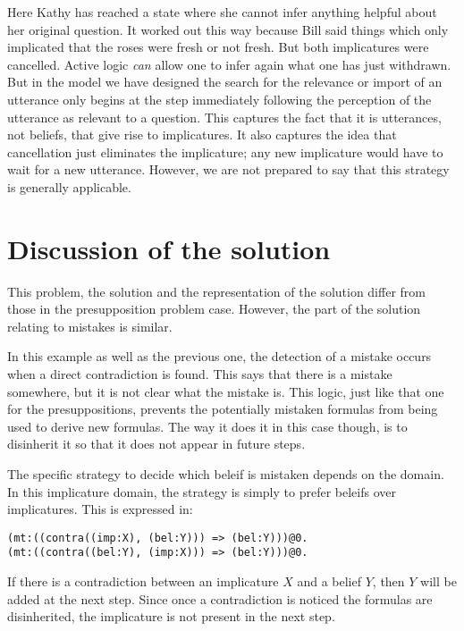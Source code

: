 \documentclass{article}
\begin{document}
Here Kathy has reached a state where she cannot infer anything helpful
about her original question. It worked out this way because Bill said
things which only implicated that the roses were fresh or not
fresh. But both implicatures were cancelled. Active logic {\sl can}
allow one to infer again what one has just withdrawn. But in the model
we have designed the search for the relevance or import of an
utterance only begins at the step immediately following the perception
of the utterance as relevant to a question. This captures the fact
that it is utterances, not beliefs, that give rise to implicatures. It
also captures the idea that cancellation just eliminates the
implicature; any new implicature would have to wait for a new
utterance. However, we are not prepared to say that this strategy is
generally applicable.


\section{Discussion of the solution}

This problem, the solution and the representation of the solution
differ from those in the presupposition problem case. However, the
part of the solution relating to mistakes is similar.

In this example as well as the previous one, the detection of a
mistake occurs when a direct contradiction is found. This says that
there is a mistake somewhere, but it is not clear what the mistake
is. This logic, just like that one for the presuppositions, prevents
the potentially mistaken formulas from being used to derive new
formulas. The way it does it in this case though, is to disinherit it
so that it does not appear in future steps.

The specific strategy to decide which beleif is mistaken depends on
the domain. In this implicature domain, the strategy is simply to
prefer beleifs over implicatures. This is expressed in:

\begin{verbatim}
(mt:((contra((imp:X), (bel:Y))) => (bel:Y)))@0.
(mt:((contra((bel:Y), (imp:X))) => (bel:Y)))@0.
\end{verbatim}

If there is a contradiction between an implicature $X$ and a belief
$Y$, then $Y$ will be added at the next step. Since once a
contradiction is noticed the formulas are disinherited, the
implicature is not present in the next step.
\end{document}
